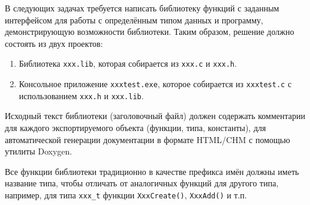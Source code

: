 
В следующих задачах требуется написать библиотеку функций с заданным
интерфейсом для работы с определённым типом данных и программу,
демонстрирующую возможности библиотеки. Таким образом, решение должно состоять
из двух проектов:
%
\begin{enumerate}
\item Библиотека \texttt{xxx.lib}, которая собирается из \texttt{xxx.c}
      и \texttt{xxx.h}.
\item Консольное приложение \texttt{xxxtest.exe}, которое собирается из
      \texttt{xxxtest.c} с использованием \texttt{xxx.h} и \texttt{xxx.lib}.
\end{enumerate}

Исходный текст библиотеки (заголовочный файл) должен содержать комментарии для
каждого экспортируемого объекта (функции, типа, константы), для автоматической
генерации документации в формате HTML/CHM с помощью утилиты Doxygen.%

Все функции библиотеки традиционно в качестве префикса имён должны иметь
название типа, чтобы отличать от аналогичных функций для другого типа,
например, для типа \texttt{xxx\_t} функции \texttt{XxxCreate()},
\texttt{XxxAdd()} и т.п.


\zzsectionCOMMENTS


